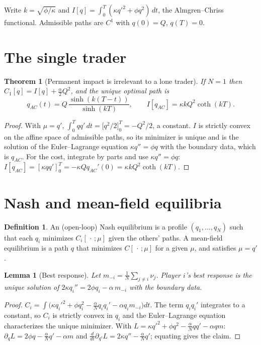 \documentclass[11pt]{article}
\newtheorem{theorem}{Theorem}
\newtheorem{lemma}{Lemma}
\theoremstyle{definition}
\newtheorem{definition}{Definition}
\theoremstyle{remark}
\begin{document}
Write $k=\sqrt{\phi/\kappa}$ and $I[q]=\int_0^T(\kappa q'^2+\phi q^2)\,dt$, the Almgren--Chriss
functional. Admissible paths are $C^1$ with $q(0)=Q$, $q(T)=0$.

\section{The single trader}
\begin{theorem}[Permanent impact is irrelevant to a lone trader]\label{thm:single}
If $N=1$ then $C_1[q]=I[q]+\tfrac{\alpha}{2}Q^2$, and the unique optimal path is
\[
q_{AC}(t) = Q\,\frac{\sinh(k(T-t))}{\sinh(kT)},\qquad I[q_{AC}] = \kappa k Q^2\coth(kT).
\]
\end{theorem}
\begin{proof}
With $\mu=q'$, $\int_0^T q q'\,dt=\big[q^2/2\big]_0^T=-Q^2/2$, a constant. $I$ is strictly
convex on the affine space of admissible paths, so its minimizer is unique and is the
solution of the Euler--Lagrange equation $\kappa q''=\phi q$ with the boundary data, which is
$q_{AC}$. For the cost, integrate by parts and use $\kappa q''=\phi q$:
$I[q_{AC}]=[\kappa q q']_0^T=-\kappa Q q_{AC}'(0)=\kappa kQ^2\coth(kT)$.
\end{proof}

\section{Nash and mean-field equilibria}
\begin{definition}
An (open-loop) Nash equilibrium is a profile $(q_1,\dots,q_N)$ such that each $q_i$
minimizes $C_i[\,\cdot\,;\mu]$ given the others' paths. A mean-field equilibrium is a path
$q$ that minimizes $C[\,\cdot\,;\mu]$ for a given $\mu$, and satisfies $\mu=q'$.
\end{definition}

\begin{lemma}[Best response]\label{lem:br}
Let $m_{-i}=\frac1N\sum_{j\neq i}\nu_j$. Player $i$'s best response is the unique solution of
$2\kappa q_i'' = 2\phi q_i - \alpha\, m_{-i}$ with the boundary data.
\end{lemma}
\begin{proof}
$C_i = \int\big(\kappa q_i'^2+\phi q_i^2-\tfrac{\alpha}{N}q_iq_i'-\alpha q_i m_{-i}\big)dt$.
The term $q_iq_i'$ integrates to a constant, so $C_i$ is strictly convex in $q_i$ and the
Euler--Lagrange equation characterizes the unique minimizer. With
$L=\kappa q'^2+\phi q^2-\tfrac{\alpha}{N}qq'-\alpha q m$:
$\partial_q L=2\phi q-\tfrac{\alpha}{N}q'-\alpha m$ and
$\tfrac{d}{dt}\partial_{q'}L=2\kappa q''-\tfrac{\alpha}{N}q'$; equating gives the claim.
\end{proof}
\end{document}
